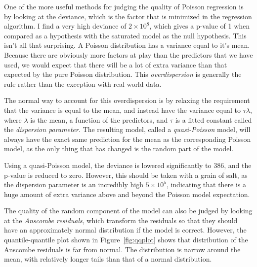 \documentclass[11pt]{article}
\newcommand{\fref}[1]{Figure~\ref{fig:#1}}
\begin{document}

One of the more useful methods for judging the quality of Poisson regression is by looking at the deviance, which is the factor that is minimized in the regression algorithm.
I find a very high deviance of $2\times 10^8$, which gives a p-value of 1 when compared as a hypothesis with the saturated model as the null hypothesis.
This isn't all that surprising.
A Poisson distribution has a variance equal to it's mean.
Because there are obviously more factors at play than the predictors that we have used, we would expect that there will be a lot of extra variance than that expected by the pure Poisson distribution. This {\it overdispersion} is generally the rule rather than the exception with real world data.

The normal way to account for this overdispersion is by relaxing the requirement that the variance is equal to the mean, and instead have the variance equal to $\tau \lambda$, where $\lambda$ is the mean, a function of the predictors, and $\tau$ is a fitted constant called the {\it dispersion parameter}. The resulting model, called a {\it quasi-Poisson} model, will always have the exact same prediction for the mean as the corresponding Poisson model, as the only thing that has changed is the random part of the model.

Using a quasi-Poisson model, the deviance is lowered significantly to 386, and the p-value is reduced to zero.
However, this should be taken with a grain of salt, as the dispersion parameter is an incredibly high $5\times10^5$, indicating that there is a huge amount of extra variance above and beyond the Poisson model expectation.

The quality of the random component of the model can also be judged by looking at the {\it Anscombe residuals}, which transform the residuals so that they should have an approximately normal distribution if the model is correct.
However, the quantile-quantile plot shown in \fref{qqplot} shows that distribution of the Anscombe residuals is far from normal.
The distribution is narrow around the mean, with relatively longer tails than that of a normal distribution.
\end{document}
